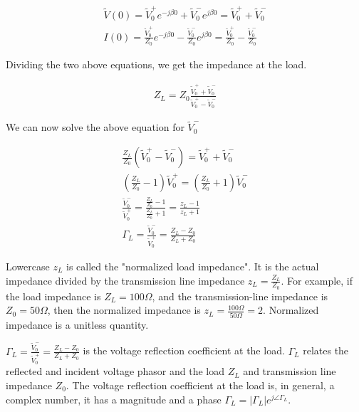 \documentclass{ximera}
\begin{document}
\begin{eqnarray}
\tilde{V}(0)=\tilde{V}_0^+ e^{-j \beta 0} +\tilde{V}_0^- e^{j \beta 0} = \tilde{V}_0^+ + \tilde{V}_0^- \label{eq:RCvtl1} \\ 
I(0)=\frac{\tilde{V}_0^+}{Z_0} e^{- j \beta 0} - \frac{\tilde{V}_0^-}{Z_0} e^{ j \beta 0} =\frac{\tilde{V}_0^+}{Z_0} - \frac{\tilde{V}_0^-}{Z_0}\label{eq:RCctl1}
\end{eqnarray}

Dividing the two above equations, we get the impedance at the load.


\begin{eqnarray}
Z_L=Z_0 \frac{\tilde{V}_0^+ + \tilde{V}_0^-}{\tilde{V}_0^+ - \tilde{V}_0^-}
\end{eqnarray}


We can now solve the above equation for $\tilde{V}_0^-$

\begin{eqnarray}
\frac{Z_L}{Z_0} (\tilde{V}_0^+ - \tilde{V}_0^-) = \tilde{V}_0^+ + \tilde{V}_0^- \nonumber \\
(\frac{Z_L}{Z_0}-1)\tilde{V}_0^+ =(\frac{Z_L}{Z_0}+1) \tilde{V}_0^- \nonumber \\
\frac{\tilde{V}_0^-}{\tilde{V}_0^+} = \frac{\frac{Z_L}{Z_0}-1  }{ \frac{Z_L}{Z_0}+1 } = \frac{z_L-1}{z_L+1}
\nonumber \\
\Gamma_L=\frac{\tilde{V}_0^-}{\tilde{V}_0^+} = \frac{Z_L -Z_0}{Z_L +Z_0}
\end{eqnarray}


 Lowercase $z_L$ is called the 
"normalized load impedance". It is the actual impedance divided by the transmission line impedance $z_L=\frac{Z_L}{Z_0}$. For example, if the load impedance is $Z_L=100 \Omega$, and the transmission-line impedance is $Z_0=50 \Omega$, then the normalized impedance is $z_L=\frac{100 \Omega}{50 \Omega}=2$. Normalized impedance is a unitless quantity.



\begin{definition}
$\Gamma_L=\frac{\tilde{V}_0^-}{\tilde{V}_0^+}= \frac{Z_L -Z_0}{Z_L +Z_0}$ is the voltage reflection
coefficient at the load. $\Gamma_L$ relates the reflected and incident voltage
phasor and the load $Z_L$ and transmission line impedance $Z_0$. The voltage reflection coefficient at the load is, in general, a complex number,
it has a magnitude and a phase $\Gamma_L=|\Gamma_L| e^{j \angle \Gamma_L}$.

\end{definition}
\end{document}

